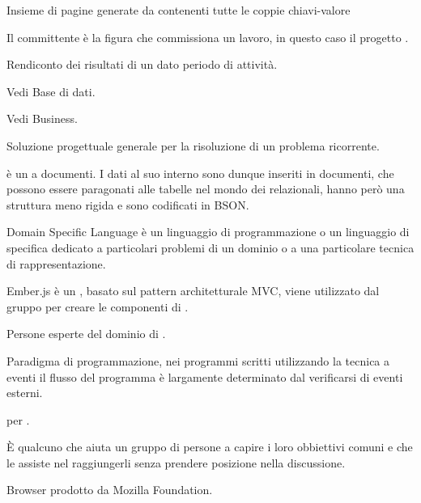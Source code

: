 Insieme di pagine generate da \ProjectName{} contenenti tutte le coppie chiavi-valore

Il committente è la figura che commissiona un lavoro, in questo caso il progetto \ProjectName{}.

Rendiconto  dei risultati di un dato periodo di attività.


Vedi Base di dati.

Vedi Business.

Soluzione progettuale generale per la risoluzione di un problema ricorrente.

 è un  a documenti. I dati al suo interno sono dunque inseriti in documenti, che possono essere paragonati alle tabelle nel mondo dei  relazionali, hanno però una struttura meno rigida e sono codificati in BSON.

Domain Specific Language è un linguaggio di programmazione o un linguaggio di specifica dedicato a particolari problemi di un dominio o a una particolare tecnica di rappresentazione.


Ember.js è un   , basato sul pattern architetturale MVC, viene utilizzato dal gruppo per creare le componenti  di \ProjectName{}.

Persone esperte del dominio di .

Paradigma di programmazione, nei programmi scritti utilizzando la tecnica a eventi il flusso del programma è largamente determinato dal verificarsi di eventi esterni. 

 per .


È qualcuno che aiuta un gruppo di persone a capire i loro obbiettivi comuni e che le assiste nel raggiungerli senza prendere posizione nella discussione.

Browser  prodotto da Mozilla Foundation.

